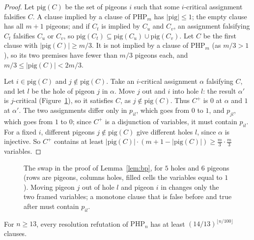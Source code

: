 \begin{proof}
Let $\mathrm{pig}(C)$ be the set of pigeons $i$ such that some $i$-critical assignment falsifies $C$. A clause implied by a clause of $\mathrm{PHP}_m$ has $|\mathrm{pig}|\le1$; the empty clause has all $m+1$ pigeons; and if $C_t$ is implied by $C_u$ and $C_v$, an assignment falsifying $C_t$ falsifies $C_u$ or $C_v$, so $\mathrm{pig}(C_t)\subseteq\mathrm{pig}(C_u)\cup\mathrm{pig}(C_v)$. Let $C$ be the first clause with $|\mathrm{pig}(C)|\ge m/3$. It is not implied by a clause of $\mathrm{PHP}_m$ (as $m/3>1$), so its two premises have fewer than $m/3$ pigeons each, and $m/3\le|\mathrm{pig}(C)|<2m/3$.

Let $i\in\mathrm{pig}(C)$ and $j\notin\mathrm{pig}(C)$. Take an $i$-critical assignment $\alpha$ falsifying $C$, and let $l$ be the hole of pigeon $j$ in $\alpha$. Move $j$ out and $i$ into hole $l$: the result $\alpha'$ is $j$-critical (Figure~\ref{fig:pigeons}), so it satisfies $C$, as $j\notin\mathrm{pig}(C)$. Thus $C^+$ is $0$ at $\alpha$ and $1$ at $\alpha'$. The two assignments differ only in $p_{il}$, which goes from $0$ to $1$, and $p_{jl}$, which goes from $1$ to $0$; since $C^+$ is a disjunction of variables, it must contain $p_{il}$. For a fixed $i$, different pigeons $j\notin\mathrm{pig}(C)$ give different holes $l$, since $\alpha$ is injective. So $C^+$ contains at least $|\mathrm{pig}(C)|\cdot(m+1-|\mathrm{pig}(C)|)\ge\frac m3\cdot\frac m3$ variables.
\end{proof}

\begin{figure}[ht]
\centering
{}
\caption{The swap in the proof of Lemma~\ref{lem:bp}, for $5$ holes and $6$ pigeons (rows are pigeons, columns holes, filled cells the variables equal to $1$). Moving pigeon $j$ out of hole $l$ and pigeon $i$ in changes only the two framed variables; a monotone clause that is false before and true after must contain $p_{il}$.}
\label{fig:pigeons}
\end{figure}

\begin{theorem}[Haken 1985]\label{thm:haken}
For $n\ge13$, every resolution refutation of $\mathrm{PHP}_n$ has at least $(14/13)^{\lfloor n/100\rfloor}$ clauses.
\end{theorem}

